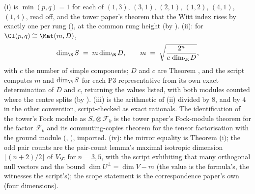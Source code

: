 (i) is $\min(p,q) = 1$ for each of $(1,3)$, $(3,1)$, $(2,1)$, $(1,2)$, $(4,1)$, $(1,4)$, read off, and the tower paper's theorem that the Witt index rises by exactly one per rung (), at the common rung height (by ). (ii): for $\Cl(p,q) \cong \Mat(m, D)$,
\[
\dim_{\R} S \;=\; m \dim_{\R} D, \qquad m \;=\; \sqrt{\frac{2^{n}}{c\,\dim_{\R} D}},
\]
with $c$ the number of simple components; $D$ and $c$ are Theorem , and the script computes $m$ and $\dim_{\R} S$ for each P3 representative from its own exact determination of $D$ and $c$, returning the values listed, with both modules counted where the centre splits (by ). (iii) is the arithmetic of (ii) divided by $8$, and by $4$ in the other convention, script-checked as exact rationals. The identification of the tower's Fock module as $S_{r} \otimes \mathcal{F}_{k}$ is the tower paper's Fock-module theorem for the factor $\mathcal{F}_{k}$ and its commuting-copies theorem for the tensor factorisation with the ground module \cite[Thms.~4.2 and 3.2]{ButlerT3} (, ), imported. (iv): the mirror equality is Theorem (i); the odd pair counts are the pair-count lemma's maximal isotropic dimension $\lfloor (n+2)/2 \rfloor$ of $V_{\C}$ for $n = 3, 5$, with the script exhibiting that many orthogonal null vectors and the bound $\dim U^{\perp} = \dim V - m$ (the value is the formula's, the witnesses the script's); the scope statement is the correspondence paper's own (four dimensions).
